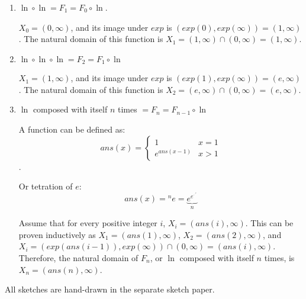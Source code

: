 \documentclass{article}
\begin{document}
\begin{enumerate}
\item $\ln \circ \ln = F_1 = F_0 \circ \ln$.

$X_0 = (0, \infty)$, and its image under $exp$ is $(exp(0), exp(\infty)) = (1, \infty)$. The natural domain of this function is $X_1 = (1, \infty) \cap (0, \infty) = (1, \infty)$.

\item $\ln \circ \ln \circ \ln = F_2 = F_1 \circ \ln$

$X_1 = (1, \infty)$, and its image under $exp$ is $(exp(1), exp(\infty)) = (e, \infty)$. The natural domain of this function is $X_2 = (e, \infty) \cap (0, \infty) = (e, \infty)$.

\item $\ln$ composed with itself $n$ times $= F_n = F_{n - 1} \circ \ln$

A function  can be defined as:
$$ans(x) = \left\{
\begin{array}{lc}
1            & x = 1 \\
e^{ans(x-1)} & x > 1 
\end{array}
\right.$$.

Or tetration of $e$:
$$ans(x) = {^{n}e} = \underbrace{e^{e^{\cdot^{\cdot^{e}}}}}_n$$

Assume that for every positive integer $i$, $X_i = (ans(i), \infty)$. This can be proven inductively as $X_1 = (ans(1), \infty)$, $X_2 = (ans(2), \infty)$, and $X_i = (exp(ans(i-1)), exp(\infty)) \cap (0, \infty) = (ans(i), \infty)$. Therefore, the natural domain of $F_n$, or $\ln$ composed with itself $n$ times, is $X_n = (ans(n), \infty)$.
\end{enumerate}

\newcommand \vect[1]{\vec{\mathbf{#1}}}

All sketches are hand-drawn in the separate sketch paper.
\end{document}
